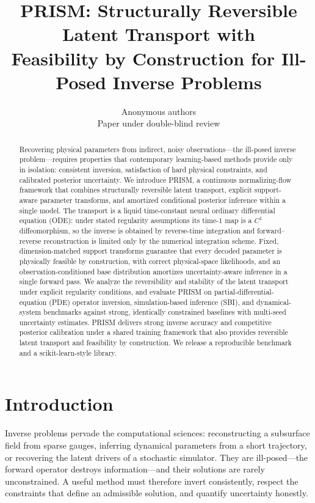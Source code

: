 \documentclass{article}
\title{PRISM: Structurally Reversible Latent Transport with \\ Feasibility by Construction for Ill-Posed Inverse Problems}
\author{Anonymous authors \\ Paper under double-blind review}
\begin{document}
\maketitle

\begin{abstract}
Recovering physical parameters from indirect, noisy observations---the ill-posed
inverse problem---requires properties that contemporary learning-based methods
provide only in isolation: consistent inversion, satisfaction of hard physical
constraints, and calibrated posterior uncertainty. We introduce PRISM, a
continuous normalizing-flow framework that combines structurally reversible latent
transport, explicit support-aware parameter transforms, and amortized conditional
posterior inference within a single model. The transport is a liquid
time-constant neural ordinary differential equation (ODE): under stated regularity
assumptions its time-$1$ map is a $C^{1}$ diffeomorphism, so the inverse is
obtained by reverse-time integration and forward--reverse reconstruction is
limited only by the numerical integration scheme. Fixed, dimension-matched support
transforms guarantee that every decoded parameter is physically feasible by
construction, with correct physical-space likelihoods, and an observation-conditioned
base distribution amortizes uncertainty-aware inference in a single forward pass.
We analyze the reversibility and stability of the latent transport under explicit
regularity conditions, and evaluate PRISM on partial-differential-equation (PDE)
operator inversion, simulation-based inference (SBI), and dynamical-system
benchmarks against strong, identically constrained baselines with multi-seed
uncertainty estimates. PRISM delivers strong inverse accuracy and competitive
posterior calibration under a shared training framework that also provides
reversible latent transport and feasibility by construction. We release a
reproducible benchmark and a scikit-learn-style library.
\end{abstract}

\section{Introduction}
Inverse problems pervade the computational sciences: reconstructing a subsurface
field from sparse gauges, inferring dynamical parameters from a short trajectory,
or recovering the latent drivers of a stochastic simulator. They are ill-posed---the
forward operator destroys information---and their solutions are rarely
unconstrained. A useful method must therefore invert consistently, respect the
constraints that define an admissible solution, and quantify uncertainty honestly.
\end{document}
